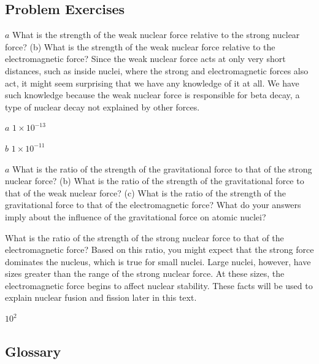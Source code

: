 \documentclass[
]{book}
\begin{document}
\hypertarget{fs-id3082682}{}
\hypertarget{problem-exercises-5}{%
\subsection{Problem Exercises}\label{problem-exercises-5}}

\hypertarget{fs-id2680982}{}
\leavevmode{}%
\(a\) What is the strength of the weak nuclear force relative to the
strong nuclear force? (b) What is the strength of the weak nuclear force
relative to the electromagnetic force? Since the weak nuclear force acts
at only very short distances, such as inside nuclei, where the strong
and electromagnetic forces also act, it might seem surprising that we
have any knowledge of it at all. We have such knowledge because the weak
nuclear force is responsible for beta decay, a type of nuclear decay not
explained by other forces.

\leavevmode{}%
\(a\) \({1 \times \text{10}^{- \text{13}}}{}\)

\(b\) \({1 \times \text{10}^{- \text{11}}}{}\)

\hypertarget{fs-id2670330}{}
\leavevmode{}%
\(a\) What is the ratio of the strength of the gravitational force to
that of the strong nuclear force? (b) What is the ratio of the strength
of the gravitational force to that of the weak nuclear force? (c) What
is the ratio of the strength of the gravitational force to that of the
electromagnetic force? What do your answers imply about the influence of
the gravitational force on atomic nuclei?

\hypertarget{fs-id3092040}{}
\leavevmode{}%
What is the ratio of the strength of the strong nuclear force to that of
the electromagnetic force? Based on this ratio, you might expect that
the strong force dominates the nucleus, which is true for small nuclei.
Large nuclei, however, have sizes greater than the range of the strong
nuclear force. At these sizes, the electromagnetic force begins to
affect nuclear stability. These facts will be used to explain nuclear
fusion and fission later in this text.

\leavevmode{}%
\(\text{10}^{2}{}\)

\hypertarget{glossary-16}{%
\subsection{Glossary}\label{glossary-16}}
\end{document}
